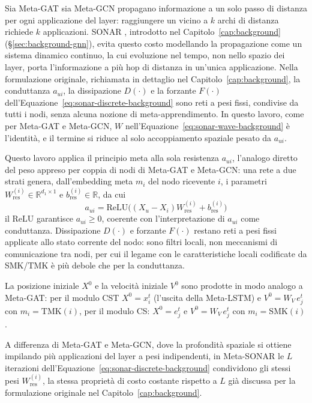 Sia Meta-GAT sia Meta-GCN propagano informazione a un solo passo di
distanza per ogni applicazione del layer: raggiungere un vicino a $k$
archi di distanza richiede $k$ applicazioni. SONAR \citep{trenta2025sonar},
introdotto nel Capitolo~\ref{cap:background} (§\ref{sec:background-gnn}),
evita questo costo modellando la propagazione come un sistema dinamico
continuo, la cui evoluzione nel tempo, non nello spazio dei layer, porta
l'informazione a più hop di distanza in un'unica applicazione. Nella
formulazione originale, richiamata in dettaglio nel Capitolo~\ref{cap:background},
la conduttanza $a_{ui}$, la dissipazione $D(\cdot)$ e la forzante $F(\cdot)$
dell'Equazione~\ref{eq:sonar-discrete-background} sono reti a pesi fissi,
condivise da tutti i nodi, senza alcuna nozione di meta-apprendimento. In
questo lavoro, come per Meta-GAT e Meta-GCN, $W$ nell'Equazione~\ref{eq:sonar-wave-background}
è l'identità, e il termine si riduce al solo accoppiamento spaziale pesato
da $a_{ui}$.

Questo lavoro applica il principio meta alla sola resistenza
$a_{ui}$, l'analogo diretto del peso appreso per coppia di nodi di Meta-GAT
e Meta-GCN: una rete a due strati genera, dall'embedding meta $m_i$ del nodo
ricevente $i$, i parametri $W_{\mathrm{res}}^{(i)} \in \mathbb{R}^{d_1
    \times 1}$ e $b_{\mathrm{res}}^{(i)} \in \mathbb{R}$, da cui
\begin{equation}
  a_{ui} = \mathrm{ReLU}\Big((X_u - X_i)W_{\mathrm{res}}^{(i)} + b_{\mathrm{res}}^{(i)}\Big)
  \label{eq:sonar-resistance}
\end{equation}
il $\mathrm{ReLU}$ garantisce $a_{ui} \geq 0$, coerente con l'interpretazione
di $a_{ui}$ come conduttanza. Dissipazione $D(\cdot)$ e forzante $F(\cdot)$
restano reti a pesi fissi applicate allo stato corrente del nodo: sono
filtri locali, non meccanismi di comunicazione tra nodi, per cui il legame
con le caratteristiche locali codificate da SMK/TMK è più debole che per la
conduttanza.

La posizione iniziale $X^0$ e la velocità iniziale $V^0$ sono prodotte in modo analogo a Meta-GAT:
per il modulo CST $X^0=x_i^t$ (l'uscita della Meta-LSTM) e $V^0=W_V\,e_j^t$ con $m_i=\mathrm{TMK}(i)$,
per il modulo CS: $X^0=e_j^t$ e $V^0=W_V\,e_j^t$ con $m_i=\mathrm{SMK}(i)$.

A differenza di Meta-GAT e Meta-GCN, dove la profondità spaziale si ottiene
impilando più applicazioni del layer a pesi indipendenti, in Meta-SONAR le
$L$ iterazioni dell'Equazione~\ref{eq:sonar-discrete-background} condividono
gli stessi pesi $W_{\mathrm{res}}^{(i)}$, la stessa proprietà di costo
costante rispetto a $L$ già discussa per la formulazione originale nel
Capitolo~\ref{cap:background}.

